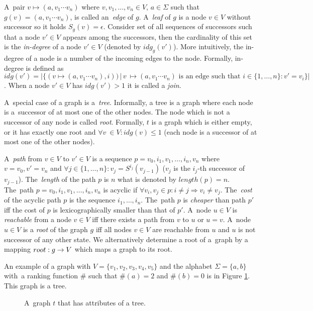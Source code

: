 \documentclass[a4paper, 12pt]{article}
\begin{document}
A~pair $v \mapsto (a, v_1 \cdots v_n)$ where $v, v_1, \ldots, v_n \in V$,
$a \in \Sigma$ such that $g(v) = (a, v_1 \cdots v_n)$, is called an~\emph{edge} of $g$.
A~\emph{leaf} of $g$ is a node $v \in V$ without successor so it holds $S_g(v) = \epsilon$.
Consider set of all sequences of successors such that a node $v' \in V$ appears among the successors, then
the cardinality of this set is the \emph{in-degree} of a node $v' \in V$ (denoted by $idg_g(v')$).
More intuitively, the in-degree of a node is a number of the incoming edges to the node.
Formally, in-degree is defined as
$idg(v') = |\{(v \mapsto (a, v_1 \cdots v_n),i)) \,|\, v~\mapsto (a, v_1 \cdots v_n)
\text{ is an edge such that } i \in \{1,\ldots,n\}: v' = v_i\}|$.
When a node $v' \in V$ has $idg(v') > 1$ it is called a \emph{join}.

A~special case of a graph is a~\emph{tree}.
Informally, a tree is a graph where each node is
a~successor of at most one of the other nodes.
The node which is not a successor of any node is called \emph{root}.
Formally, $t$ is a graph which is either empty, or it has exactly one root and $\forall v~\in V: idg(v) \leq 1$
(each node is a successor of at most one of the other nodes).

A~\emph{path} from $v\in V$ to $v' \in V$ is a sequence $p=v_0, i_1, v_1, \ldots, i_n, v_n$ where $v=v_0, v' = v_n$
and $\forall j \in \{1,\ldots,n\}: v_j = S^{i_j}(v_{j-1})$ ($v_j$ is the $i_j$-th successor of $v_{j-1}$).
The~\emph{length} of the path $p$ is $n$ what is denoted by $length(p) = n$.
The~path $p=v_0,i_1,v_1,\ldots,i_n,v_n$ is acyclic if $\forall v_i,v_j \in p: i \neq j \Rightarrow v_i \neq v_j$.
The~\emph{cost} of the acyclic path $p$ is the sequence $i_1, \ldots, i_n$.
The~path $p$ is \emph{cheaper} than path $p'$ iff the cost of $p$ is lexicographically smaller than that of $p'$. 
A~node $u \in V$ is \emph{reachable} from a node $v \in V$ iff there exists a path from $v$ to $u$ or $u=v$.
A~node $u \in V$ is a \emph{root} of the graph $g$ iff all nodes $v \in V$ are reachable from $u$
and $u$ is not successor of any other state.
We alternatively determine a root of a~graph by a mapping $root: g \rightarrow V$
which maps a graph to its root.

An example of a graph with $V=\{v_1,v_2,v_3,v_4,v_5\}$ and
the alphabet $\Sigma = \{a,b\}$ with~a ranking function $\#$ such that $\#(a) = 2$ and $\#(b) = 0$
is in Figure \ref{fig:graph_tree}.
This graph is a tree.

	\begin{figure}[bth]
		\begin{center}
			
		\end{center}
		\caption{A~graph $t$ that has attributes of a tree.}
		\label{fig:graph_tree}
	\end{figure}
	\label{ex:graph}
\end{document}

